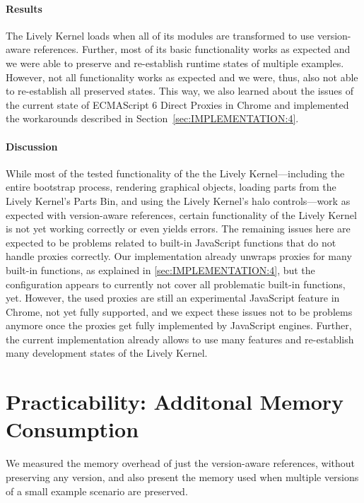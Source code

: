 \paragraph{Results}
The Lively Kernel loads when all of its modules are transformed to use version-aware references.
Further, most of its basic functionality works as expected and we were able to preserve and re-establish runtime states of multiple examples.
However, not all functionality works as expected and we were, thus, also not able to re-establish all preserved states. 
This way, we also learned about the issues of the current state of ECMAScript 6 Direct Proxies in Chrome and implemented the workarounds described in Section~\ref{sec:IMPLEMENTATION:4}.

\paragraph{Discussion}
While most of the tested functionality of the the Lively Kernel---including the entire bootstrap process, rendering graphical objects, loading parts from the Lively Kernel's Parts Bin, and using the Lively Kernel's halo controls---work as expected with version-aware references, certain functionality of the Lively Kernel is not yet working correctly or even yields errors.
The remaining issues here are expected to be problems related to built-in JavaScript functions that do not handle proxies correctly.
Our implementation already unwraps proxies for many built-in functions, as explained in \ref{sec:IMPLEMENTATION:4}, but the configuration appears to currently not cover all problematic built-in functions, yet.
However, the used proxies are still an experimental JavaScript feature in Chrome, not yet fully supported, and we expect these issues not to be problems anymore once the proxies get fully implemented by JavaScript engines.
Further, the current implementation already allows to use many features and re-establish many development states of the Lively Kernel.




\section{Practicability: Additonal Memory Consumption} \label{sec:DISCUSSION:2}

We measured the memory overhead of just the version-aware references, without preserving any version, and also present the memory used when multiple versions of a small example scenario are preserved.

